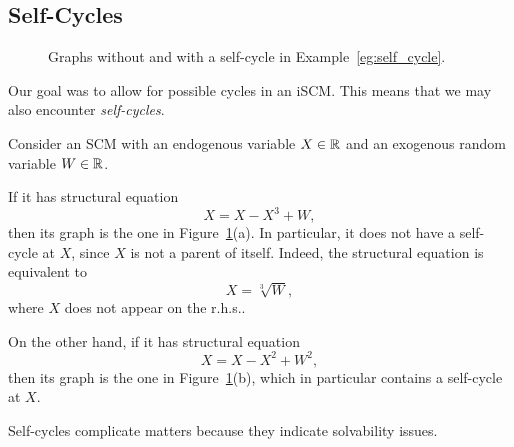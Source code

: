 \subsection{Self-Cycles}
\begin{figure}
  \begin{center}\end{center}
  \caption{Graphs without and with a self-cycle in Example~\ref{eg:self_cycle}.\label{fig:eg:self_cycle}}
\end{figure}
Our goal was to allow for possible cycles in an iSCM. This means that we may also encounter \emph{self-cycles}.
\begin{Eg}\label{eg:self_cycle}
  Consider an SCM with an endogenous variable $X \in \mathbb{R}$ and an exogenous random variable $W \in \mathbb{R}$.

  If it has structural equation
  $$X = X -X^3 + W,$$
  then its graph is the one in Figure~\ref{fig:eg:self_cycle}(a).
  In particular, it does not have a self-cycle at $X$, since $X$ is not a parent of itself. 
  Indeed, the structural equation is equivalent to 
  $$X = \sqrt[3]{W},$$
  where $X$ does not appear on the r.h.s..
  
  On the other hand, if it has structural equation
  $$X = X -X^2 + W^2,$$
  then its graph is the one in Figure~\ref{fig:eg:self_cycle}(b), which in particular contains a self-cycle at $X$.
\end{Eg}
Self-cycles complicate matters because they indicate solvability issues.

